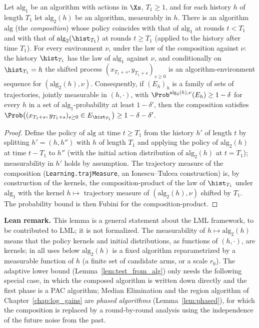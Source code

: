 \begin{lemma}\label{lem:composition}
Let $\mathrm{alg}_1$ be an algorithm with actions in $\Xs$, $T_1 \ge 1$, and for each history
$h$ of length $T_1$ let $\mathrm{alg}_2(h)$ be an algorithm, measurably in $h$. There is an
algorithm $\mathrm{alg}$ (the \emph{composition}) whose policy coincides with that of
$\mathrm{alg}_1$ at rounds $t < T_1$ and with that of $\mathrm{alg}_2(\hist_{T_1})$ at rounds
$t \ge T_1$ (applied to the history after time $T_1$). For every environment $\nu$, under the
law of the composition against $\nu$: the history $\hist_{T_1}$ has the law of
$\mathrm{alg}_1$ against $\nu$, and conditionally on $\hist_{T_1} = h$ the shifted process
$(x_{T_1+s}, y_{T_1+s})_{s\ge 0}$ is an algorithm-environment sequence for
$(\mathrm{alg}_2(h), \nu)$. Consequently, if $(E_h)_h$ is a family of sets of trajectories, jointly measurable in
$(h, \cdot)$, with
$\Prob^{\mathrm{alg}_2(h),\nu}(E_h) \ge 1-\delta$ for every $h$ in a set of $\mathrm{alg}_1$-probability
at least $1 - \delta'$, then the composition satisfies
$\Prob\big((x_{T_1+s},y_{T_1+s})_{s \ge 0} \in E_{\hist_{T_1}}\big) \ge 1 - \delta - \delta'$.
\end{lemma}

\begin{proof}
Define the policy of $\mathrm{alg}$ at time $t\ge T_1$ from the history $h'$ of length $t$ by
splitting $h' = (h, h'')$ with $h$ of length $T_1$ and applying the policy of
$\mathrm{alg}_2(h)$ at time $t - T_1$ to $h''$ (with the initial action distribution of
$\mathrm{alg}_2(h)$ at $t = T_1$); measurability in $h'$ holds by assumption. The trajectory
measure of the composition (\texttt{Learning.trajMeasure}, an Ionescu--Tulcea construction)
is, by construction of the kernels, the composition-product of the law of $\hist_{T_1}$ under
$\mathrm{alg}_1$ with the kernel $h \mapsto$ trajectory measure of $(\mathrm{alg}_2(h),\nu)$
shifted by $T_1$. The probability bound is then Fubini for the composition-product.
\end{proof}

\textbf{Lean remark.} This lemma is a general statement about the LML framework, to be
contributed to LML; it is not formalized. The measurability of $h \mapsto \mathrm{alg}_2(h)$ means that the policy
kernels and initial distributions, as functions of $(h, \cdot)$, are kernels; in all uses
below $\mathrm{alg}_2(h)$ is a fixed algorithm reparametrized by a measurable function of $h$
(a finite set of candidate arms, or a scale $r_0$). The adaptive lower bound
(Lemma~\ref{lem:test_from_alg}) only needs the following special case, in which the composed
algorithm is written down directly and the first phase is a PAC algorithm; Median Elimination
and the region algorithm of Chapter~\ref{chap:log_gains} are \emph{phased algorithms}
(Lemma~\ref{lem:phased}), for which the composition is replaced by a round-by-round analysis
using the independence of the future noise from the past.

